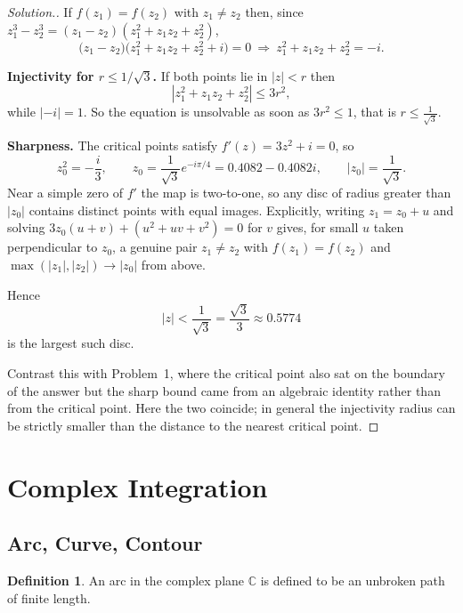 \documentclass[11pt,a4paper]{article}
\theoremstyle{definition}
\newtheorem{definition}[thm]{Definition}
\newenvironment{solution}
  {\renewcommand{\qedsymbol}{}\begin{proof}[\textit{Solution}.]}
  {\end{proof}}
\begin{document}
\begin{solution}
If $f(z_1) = f(z_2)$ with $z_1 \neq z_2$ then, since
$z_1^3 - z_2^3 = (z_1-z_2)(z_1^2+z_1z_2+z_2^2)$,
$$\big(z_1-z_2\big)\big(z_1^2 + z_1z_2 + z_2^2 + i\big) = 0
\ \Longrightarrow\ z_1^2 + z_1z_2 + z_2^2 = -i .$$

\textbf{Injectivity for $r \leq 1/\sqrt3$.} If both points lie in
$\left|z\right| < r$ then
$$\left|z_1^2 + z_1z_2 + z_2^2\right| \leq 3r^{2},$$
while $\left|-i\right| = 1$. So the equation is unsolvable as soon as
$3r^2 \leq 1$, that is $r \leq \frac{1}{\sqrt3}$.

\textbf{Sharpness.} The critical points satisfy $f'(z) = 3z^2 + i = 0$, so
$$z_0^{2} = -\frac{i}{3},\qquad
z_0 = \frac{1}{\sqrt3}e^{-i\pi/4} = 0.4082 - 0.4082i,
\qquad \left|z_0\right| = \frac{1}{\sqrt3} .$$
Near a simple zero of $f'$ the map is two-to-one, so any disc of radius greater
than $\left|z_0\right|$ contains distinct points with equal images. Explicitly,
writing $z_1 = z_0 + u$ and solving
$3z_0(u+v) + (u^2+uv+v^2) = 0$ for $v$ gives, for small $u$ taken perpendicular
to $z_0$, a genuine pair $z_1 \neq z_2$ with $f(z_1) = f(z_2)$ and
$\max(\left|z_1\right|,\left|z_2\right|) \rightarrow \left|z_0\right|$ from above.

Hence
$$\boxed{\left|z\right| < \frac{1}{\sqrt3} = \frac{\sqrt3}{3} \approx 0.5774}$$
is the largest such disc.

Contrast this with Problem~1, where the critical point also sat on the boundary of
the answer but the sharp bound came from an algebraic identity rather than from
the critical point. Here the two coincide; in general the injectivity radius can
be strictly smaller than the distance to the nearest critical point.
\end{solution}

\pagebreak
{\color[wave]{485}\section{Complex Integration}}


{\color[wave]{485}\subsection{Arc, Curve, Contour}}


\begin{definition}
An arc in the complex plane $\mathbb{C}$ is defined to be an unbroken path of finite length.
\end{definition}
\end{document}
